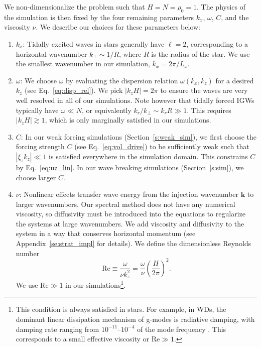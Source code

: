 \documentclass[
        fleqn,
        usenatbib,
    ]{mnras}
\newcommand*{\abs}[1]{\left|#1\right|}
\newcommand*{\p}[1]{\left(#1\right)}
\newcommand*{\bm}[1]{\mathbf{#1}}
\begin{document}
We non-dimensionalize the problem such that $H = N = \rho_0 = 1$. The physics of
the simulation is then fixed by the four remaining parameters $k_{x}$, $\omega$,
$C$, and the viscosity $\nu$. We describe our choices for these parameters
below:
\begin{enumerate}
    \item $k_{x}$: Tidally excited waves in stars generally have $\ell = 2$,
        corresponding to a horizontal wavenumber $k_\perp\sim 1/R$, where $R$ is
        the radius of the star. We use the smallest wavenumber in our
        simulation, $k_x=2\pi/L_x$.

    \item $\omega$: We choose $\omega$ by evaluating the dispersion relation
        $\omega(k_x, k_z)$ for a desired $k_z$ (see Eq.~\eqref{eq:disp_rel}). We
        pick $\abs{k_z H} = 2\pi$ to ensure the waves are very well resolved in
        all of our simulations. Note however that tidally forced IGWs typically
        have $\omega \ll N$, or equivalently $k_r/k_\perp \sim k_r R \gg 1$.
        This requires $\abs{k_z H} \gtrsim 1$, which is only marginally
        satisfied in our simulations.

    \item $C$: In our weak forcing simulations (Section~\ref{s:weak_sim}),
        we first choose the forcing strength $C$ (see Eq.~\eqref{eq:vol_drive})
        to be sufficiently weak such that $\abs{\xi_z k_z} \ll 1$ is satisfied
        everywhere in the simulation domain. This constrains $C$ by
        Eq.~\eqref{eq:uz_lin}. In our wave breaking simulations
        (Section~\ref{s:sim}), we choose larger $C$.

    \item $\nu$: Nonlinear effects transfer wave energy from the injection
        wavenumber $\bm{k}$ to larger wavenumbers. Our spectral method does not
        have any numerical viscosity, so diffusivity must be introduced into the
        equations to regularize the systems at large wavenumbers. We add
        viscosity and diffusivity to the system in a way that conserves
        horizontal momentum (see Appendix~\ref{se:strat_impl} for details). We
        define the dimensionless Reynolds number
        \begin{equation}
            \mathrm{Re} \equiv \frac{\omega}{\nu k_{z}^2}
                = \frac{\omega}{\nu}\p{\frac{H}{2\pi}}^2.\label{eq:re_def}
        \end{equation}
        We use $\mathrm{Re} \gg 1$ in our simulations\footnote{This condition
        is always satisfied in stars. For example, in WDs, the dominant linear
        dissipation mechanism of g-modes is radiative damping, with damping rate
        ranging from $10^{-11}$--$10^{-4}$ of the mode frequency
        \citep{fullerI}. This corresponds to a small effective viscosity or
        $\mathrm{Re} \gg 1$.}.
\end{enumerate}
\end{document}
